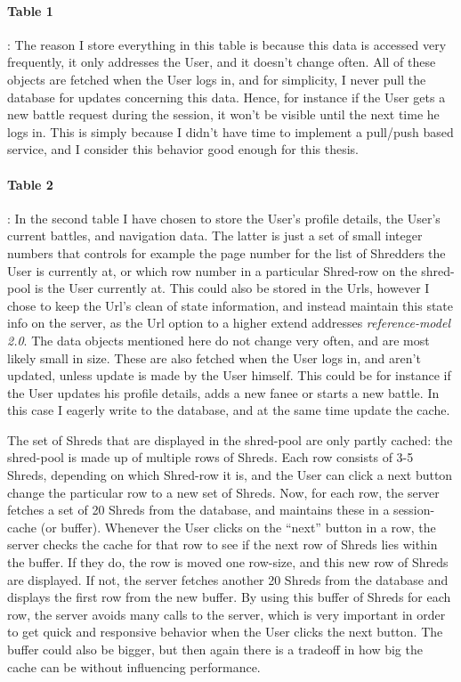 \paragraph{Table 1}:
 The reason I store everything in this table is because this data is accessed very frequently, it only addresses the User, and it doesn't change often. All of these objects are fetched when the User logs in, and for simplicity, I never pull the database for updates concerning this data. Hence, for instance if the User gets a new battle request during the session, it won't be visible until the next time he logs in. This is simply because I didn't have time to implement a pull/push based service, and I consider this behavior good enough for this thesis. 
 
\paragraph{Table 2}:
In the second table I have chosen to store the User's profile details, the User's current battles, and navigation data. The latter is just a set of small integer numbers that controls for example the page number for the list of Shredders the User is currently at, or which row number in a particular Shred-row on the shred-pool is the User currently at. This could also be stored in the Urls, however I chose to keep the Url's clean of state information, and instead maintain this state info on the server, as the Url option to a higher extend addresses \textit{reference-model 2.0}. The data objects mentioned here do not change very often, and are most likely small in size. These are also fetched when the User logs in, and aren't updated, unless update is made by the User himself. This could be for instance if the User updates his profile details, adds a new fanee or starts a new battle. In this case I eagerly write to the database, and at the same time update the cache.


The set of Shreds that are displayed in the shred-pool are only partly cached: the shred-pool is made up of multiple rows of Shreds. Each row consists of 3-5 Shreds, depending on which Shred-row it is, and the User can click a next button change the particular row to a new set of Shreds. Now, for each row, the server fetches a set of 20 Shreds from the database, and maintains these in a session-cache (or buffer). Whenever the User clicks on the ``next'' button in a row, the server checks the cache for that row to see if the next row of Shreds lies within the buffer. If they do, the row is moved one row-size, and this new row of Shreds are displayed. If not, the server fetches another 20 Shreds from the database and displays the first row from the new buffer. By using this buffer of Shreds for each row, the server avoids many calls to the server, which is very important in order to get quick and responsive behavior when the User clicks the next button. The buffer could also be bigger, but then again there is a tradeoff in how big the cache can be without influencing performance. 

